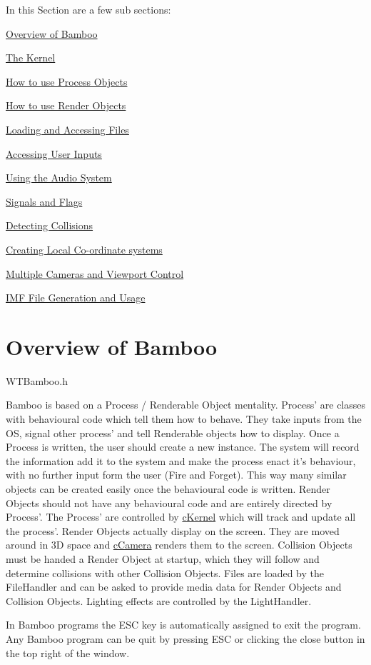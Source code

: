 In this Section are a few sub sections:
\begin{DoxyEnumerate}
\item \hyperlink{_using_engine_page_MainLoop}{Overview of Bamboo}
\item \hyperlink{_using_engine_page_KernelPage}{The Kernel}
\item \hyperlink{_using_engine_page_ProcessObjectsPage}{How to use Process Objects}
\item \hyperlink{_using_engine_page_RenderObjectsPage}{How to use Render Objects}
\item \hyperlink{_using_engine_page_FilesAccessPage}{Loading and Accessing Files}
\item \hyperlink{_using_engine_page_InputsPage}{Accessing User Inputs}
\item \hyperlink{_using_engine_page_AudioPage}{Using the Audio System}
\item \hyperlink{_using_engine_page_SignalsPage}{Signals and Flags}
\item \hyperlink{_using_engine_page_CollisionsPage}{Detecting Collisions}
\item \hyperlink{_using_engine_page_RenderNodesPage}{Creating Local Co-\/ordinate systems}
\item \hyperlink{_using_engine_page_MultipleCamerasViewports}{Multiple Cameras and Viewport Control}
\item \hyperlink{_using_engine_page_IMFGenerationPage}{IMF File Generation and Usage}
\end{DoxyEnumerate}\hypertarget{_using_engine_page_MainLoop}{}\section{Overview of Bamboo}\label{_using_engine_page_MainLoop}
WTBamboo.h

Bamboo is based on a Process / Renderable Object mentality. Process' are classes with behavioural code which tell them how to behave. They take inputs from the OS, signal other process' and tell Renderable objects how to display. Once a Process is written, the user should create a new instance. The system will record the information add it to the system and make the process enact it's behaviour, with no further input form the user (Fire and Forget). This way many similar objects can be created easily once the behavioural code is written. Render Objects should not have any behavioural code and are entirely directed by Process'. The Process' are controlled by \hyperlink{classc_kernel}{cKernel} which will track and update all the process'. Render Objects actually display on the screen. They are moved around in 3D space and \hyperlink{classc_camera}{cCamera} renders them to the screen. Collision Objects must be handed a Render Object at startup, which they will follow and determine collisions with other Collision Objects. Files are loaded by the FileHandler and can be asked to provide media data for Render Objects and Collision Objects. Lighting effects are controlled by the LightHandler. \par
 In Bamboo programs the ESC key is automatically assigned to exit the program. Any Bamboo program can be quit by pressing ESC or clicking the close button in the top right of the window.

